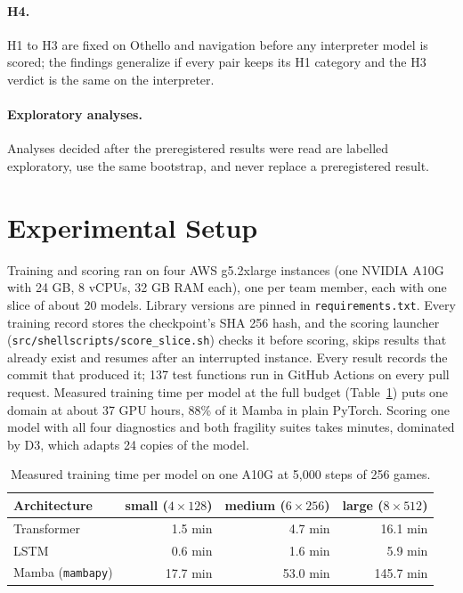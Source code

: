 \documentclass[11pt]{scrartcl}
\begin{document}
\paragraph{H4.} H1 to H3 are fixed on Othello and navigation before any interpreter model is scored; the
findings generalize if every pair keeps its H1 category and the H3 verdict is the same on the interpreter.

\paragraph{Exploratory analyses.} Analyses decided after the preregistered results were read are labelled
exploratory, use the same bootstrap, and never replace a preregistered result.

\section{Experimental Setup}

Training and scoring ran on four AWS g5.2xlarge instances (one NVIDIA A10G with 24 GB, 8 vCPUs, 32 GB RAM
each), one per team member, each with one slice of about 20 models. Library versions are pinned in
\texttt{requirements.txt}. Every training record stores the checkpoint's SHA 256 hash, and the scoring launcher
(\texttt{src/shellscripts/score\_slice.sh}) checks it before scoring, skips results that already exist and
resumes after an interrupted instance. Every result records the commit that produced it; 137 test functions
run in GitHub Actions on every pull request. Measured training time per model at the full budget
(Table~\ref{tab:throughput}) puts one domain at about 37 GPU hours, 88\% of it Mamba in plain PyTorch. Scoring
one model with all four diagnostics and both fragility suites takes minutes, dominated by D3, which adapts 24
copies of the model.

\begin{table}[H]
    \centering
    \small
    \begin{tabular}{lrrr}
    \toprule
    Architecture & small ($4\times128$) & medium ($6\times256$) & large ($8\times512$) \\
    \midrule
    Transformer & 1.5 min & 4.7 min & 16.1 min \\
    LSTM & 0.6 min & 1.6 min & 5.9 min \\
    Mamba (\texttt{mambapy}) & 17.7 min & 53.0 min & 145.7 min \\
    \bottomrule
    \end{tabular}
    \caption{Measured training time per model on one A10G at 5,000 steps of 256 games.}
    \label{tab:throughput}
\end{table}
\end{document}
